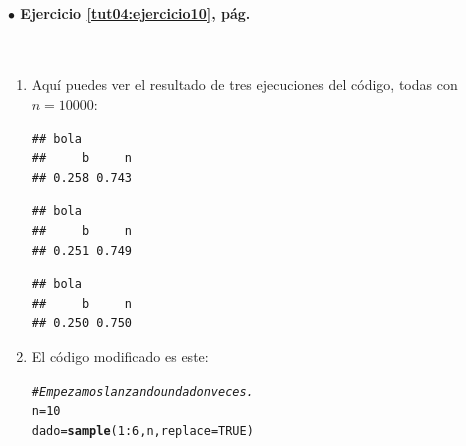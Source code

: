 \documentclass[10pt,a4paper]{article}\usepackage[]{graphicx}\usepackage[]{color}
\makeatletter
\newcommand{\hlnum}[1]{\textcolor[rgb]{0.686,0.059,0.569}{#1}}%
\newcommand{\hlcom}[1]{\textcolor[rgb]{0.678,0.584,0.686}{\textit{#1}}}%
\newcommand{\hlopt}[1]{\textcolor[rgb]{0,0,0}{#1}}%
\newcommand{\hlstd}[1]{\textcolor[rgb]{0.345,0.345,0.345}{#1}}%
\newcommand{\hlkwb}[1]{\textcolor[rgb]{0.69,0.353,0.396}{#1}}%
\newcommand{\hlkwc}[1]{\textcolor[rgb]{0.333,0.667,0.333}{#1}}%
\newcommand{\hlkwd}[1]{\textcolor[rgb]{0.737,0.353,0.396}{\textbf{#1}}}%
\newenvironment{kframe}{%
 \def\at@end@of@kframe{}%
 \ifinner\ifhmode%
  \def\at@end@of@kframe{\end{minipage}}%
  \begin{minipage}{\columnwidth}%
 \fi\fi%
 \def\FrameCommand##1{\hskip\@totalleftmargin \hskip-\fboxsep
 \colorbox{shadecolor}{##1}\hskip-\fboxsep
     \hskip-\linewidth \hskip-\@totalleftmargin \hskip\columnwidth}%
 \MakeFramed {\advance\hsize-\width
   \@totalleftmargin\z@ \linewidth\hsize
   \@setminipage}}%
 {\par\unskip\endMakeFramed%
 \at@end@of@kframe}
\newenvironment{knitrout}{}{} %
\makeatother
\begin{document}
\paragraph{\bf $\bullet$ Ejercicio \ref{tut04:ejercicio10}, pág. \pageref{tut04:ejercicio10}}
\label{tut04:ejercicio10:sol}\quad\\

\begin{enumerate}
  \item Aquí puedes ver el resultado de tres ejecuciones del código, todas con $n=10000$:
\begin{knitrout}
\color{fgcolor}\begin{kframe}
\begin{verbatim}
## bola
##     b     n 
## 0.258 0.743
\end{verbatim}
\end{kframe}
\end{knitrout}
\begin{knitrout}
\color{fgcolor}\begin{kframe}
\begin{verbatim}
## bola
##     b     n 
## 0.251 0.749
\end{verbatim}
\end{kframe}
\end{knitrout}
\begin{knitrout}
\color{fgcolor}\begin{kframe}
\begin{verbatim}
## bola
##     b     n 
## 0.250 0.750
\end{verbatim}
\end{kframe}
\end{knitrout}

      \item El código modificado es este:
\begin{knitrout}
\color{fgcolor}\begin{kframe}
\begin{alltt}
\hlcom{# Empezamos lanzando un dado n veces.}
\hlstd{n} \hlkwb{=} \hlnum{10}
\hlstd{dado} \hlkwb{=} \hlkwd{sample}\hlstd{(}\hlnum{1}\hlopt{:}\hlnum{6}\hlstd{, n,} \hlkwc{replace}\hlstd{=}\hlnum{TRUE}\hlstd{)}


\end{alltt}
\end{kframe}
\end{knitrout}
\end{enumerate}
\end{document}
